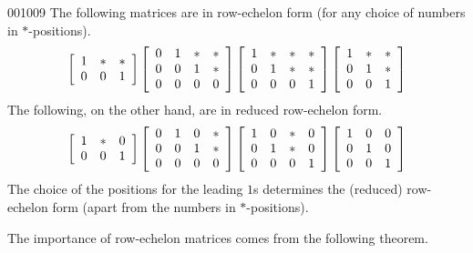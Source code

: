 \begin{example}{}{001009}
The following matrices are in row-echelon form (for any choice of numbers in $*$-positions).
\begin{equation*}
\left[ \begin{array}{rrr}
	1 & * & * \\
	0 & 0 & 1
\end{array} \right]
\left[ \begin{array}{rrrr}
	0 & 1 & * & * \\
	0 & 0 & 1 & * \\
	0 & 0 & 0 & 0
\end{array} \right]
\left[ \begin{array}{rrrr}
	1 & * & * & * \\
	0 & 1 & * & * \\
	0 & 0 & 0 & 1 
\end{array} \right]
\left[ \begin{array}{rrr}
	1 & * & * \\
	0 & 1 & * \\
	0 & 0 & 1
\end{array} \right]
\end{equation*}
The following, on the other hand, are in reduced row-echelon form.
\begin{equation*}
\left[ \begin{array}{rrr}
	1 & * & 0 \\
	0 & 0 & 1
\end{array} \right]
\left[ \begin{array}{rrrr}
	0 & 1 & 0 & * \\
	0 & 0 & 1 & * \\
	0 & 0 & 0 & 0
\end{array} \right]
\left[ \begin{array}{rrrr}
	1 & 0 & * & 0 \\
	0 & 1 & * & 0 \\
	0 & 0 & 0 & 1
\end{array} \right]
\left[ \begin{array}{rrr}
	1 & 0 & 0 \\
	0 & 1 & 0 \\
	0 & 0 & 1
\end{array} \right]
\end{equation*}
The choice of the positions for the leading $1$s determines the (reduced) row-echelon form (apart from the numbers in $*$-positions).
\end{example}

The importance of row-echelon matrices comes from the following theorem.

